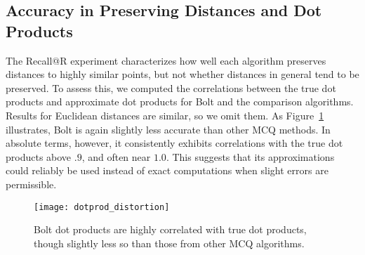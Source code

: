 
\vspace{-2mm}
\subsection{Accuracy in Preserving Distances and Dot Products}


The Recall@R experiment characterizes how well each algorithm preserves distances to highly similar points, but not whether distances in general tend to be preserved. To assess this, we computed the correlations between the true dot products and approximate dot products for Bolt and the comparison algorithms. Results for Euclidean distances are similar, so we omit them. As Figure~\ref{fig:dotprod_distortion} illustrates, Bolt is again slightly less accurate than other MCQ methods. In absolute terms, however, it consistently exhibits correlations with the true dot products above $.9$, and often near $1.0$. This suggests that its approximations could reliably be used instead of exact computations when slight errors are permissible.

\begin{figure}[h]
\begin{center}
\texttt{[image: dotprod\_distortion]}
\caption{Bolt dot products are highly correlated with true dot products, though slightly less so than those from other MCQ algorithms.}
\label{fig:dotprod_distortion}
\end{center}
\end{figure}

